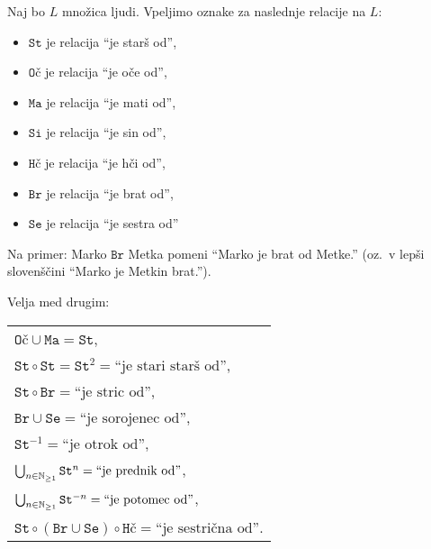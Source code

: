                 \begin{zgled}
                        Naj bo $L$ množica ljudi. Vpeljimo oznake za naslednje relacije na $L$:
                        \begin{itemize}
                                \item
                                        $\texttt{St}$ je relacija ``je starš od'',
                                \item
                                        $\texttt{Oč}$ je relacija ``je oče od'',
                                \item
                                        $\texttt{Ma}$ je relacija ``je mati od'',
                                \item
                                        $\texttt{Si}$ je relacija ``je sin od'',
                                \item
                                        $\texttt{Hč}$ je relacija ``je hči od'',
                                \item
                                        $\texttt{Br}$ je relacija ``je brat od'',
                                \item
                                        $\texttt{Se}$ je relacija ``je sestra od''
                        \end{itemize}

                        Na primer: Marko $\texttt{Br}$ Metka pomeni ``Marko je brat od Metke.'' (oz.~v lepši slovenščini ``Marko je Metkin brat.'').

                        Velja med drugim:

                        \begin{tabular}{l}
                                $\texttt{Oč} \cup \texttt{Ma} = \texttt{St}$, \\
                                $\texttt{St} \circ \texttt{St} = \texttt{St}^2 = \text{``je stari starš od''}$, \\
                                $\texttt{St} \circ \texttt{Br} = \text{``je stric od''}$, \\
                                $\texttt{Br} \cup \texttt{Se} = \text{``je sorojenec od''}$, \\
                                $\texttt{St}^{-1} = \text{``je otrok od''}$, \\
                                $\bigcup_{n \in \mathbb{N}_{\geq 1}} \texttt{St}^n = \text{``je prednik od''}$, \\
                                $\bigcup_{n \in \mathbb{N}_{\geq 1}} \texttt{St}^{-n} = \text{``je potomec od''}$, \\
                                $\texttt{St} \circ (\texttt{Br} \cup \texttt{Se}) \circ \texttt{Hč} = \text{``je sestrična od''}$.
                        \end{tabular}


\end{zgled}
